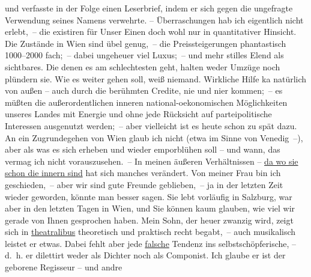 \begin{ledgroupsized}[t]{13cm}
{{{                  und verfasste in der Folge einen Leserbrief, indem er sich gegen die ungefragte
                  Verwendung seines Namens verwehrte.}}}\label{K_L02376-3h} – Überraschungen hab ich eigentlich
               nicht erlebt, – die existiren für Unser Einen doch wohl nur in quantitativer
               Hinsicht.\pend
           \pstart
           Die Zustände in Wien sind übel genug, – die
               Preissteigerungen phantastisch 1000–2000 fach; – dabei ungeheuer viel Luxus; – und
               mehr stilles Elend als sichtbares. Die denen es am schlechtesten geht, halten weder
               Umzüge noch plündern sie. Wie es weiter gehen soll, weiß niemand. Wirkliche {\pb}Hilfe ka{\geminationn} natürlich
               von außen – auch durch die berühmten Credite, nie und ni{\geminationm}er kommen; – es müßten die außerordentlichen inneren \introOben{}national-\introOben{}oekonomischen Möglichkeiten unseres Landes mit Energie und ohne
               jede Rücksicht auf \introOben{}partei\introOben{}politische  Interessen ausgenutzt werden; – aber vielleicht ist
               es heute schon zu spät dazu. An ein Zugrundegehen von Wien glaub ich nicht (etwa im Sinne von Venedig –), aber als was es sich erheben und wieder emporblühen soll – und
               wann, das vermag ich nicht vorauszusehen. –\pend
           \pstart
           In meinen äußeren Verhältnissen – \uline{da wo sie schon die
                  innern sind} hat sich manches verändert. Von meiner Frau bin ich geschieden, – aber wir sind
               gute Freunde geblieben, – ja in der letzten Zeit wieder geworden, könnte man besser
               sagen. Sie lebt vorläufig in Salzburg, war aber in
               den letzten Tagen in Wien, und Sie können kaum
               glauben, wie viel wir gerade von Ihnen gesprochen haben. Mein Sohn, der {\pb}heuer zwanzig wird, zeigt sich in \uline{theatralibus} theoretisch und praktisch recht begabt, – auch
               musikalisch leistet er etwas. Dabei fehlt aber jede \uline{falsche} Tendenz ins selbstschöpferische, – d. h. er dilettirt weder als
               Dichter noch als Componist. Ich glaube er ist der geborene Regisseur – und andre

\end{ledgroupsized}
